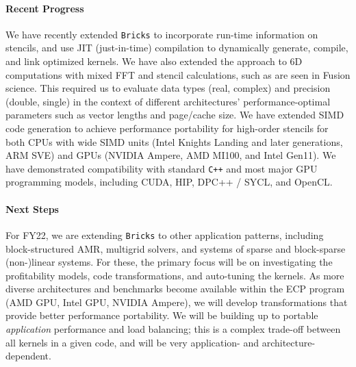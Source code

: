 \paragraph{Recent Progress}
We have recently extended  \texttt{Bricks} to 
  incorporate run-time information on stencils, and use JIT (just-in-time) compilation to
  dynamically generate, compile, and link optimized kernels.
We have also extended the approach to 6D computations with mixed FFT and stencil
  calculations, such as are seen in Fusion science.
This required us to evaluate data types (real, complex) and precision (double, single) in the 
  context of different architectures’ performance-optimal parameters such as vector lengths
  and page/cache size.
We have extended SIMD code generation to achieve performance portability
  for high-order stencils for both CPUs with wide SIMD units (Intel Knights Landing and later 
  generations, ARM SVE) and GPUs (NVIDIA Ampere, AMD MI100, and Intel Gen11).  
We have demonstrated compatibility with standard \texttt{C++} and most major GPU
  programming models, including CUDA, HIP, DPC++ / SYCL, and OpenCL.

\paragraph{Next Steps}
For FY22, we are extending \texttt{Bricks} to other
  application patterns, including block-structured AMR, multigrid solvers,
  and systems of sparse and block-sparse (non-)linear systems.
For these, the primary focus will be on investigating the profitability
  models, code transformations, and auto-tuning the kernels.
As more diverse architectures and benchmarks become available within 
  the ECP program (AMD GPU, Intel GPU, NVIDIA Ampere), we will develop 
  transformations that provide better performance portability.
We will be building up to portable \textit{application} performance 
  and load balancing; this is a complex trade-off between all kernels in
  a given code, and will be very application- and architecture-dependent.


